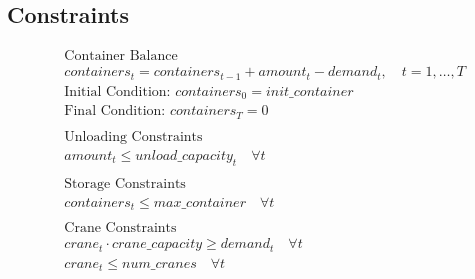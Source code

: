 \documentclass{article}
\begin{document}
\subsection*{Constraints}
\begin{align*}
    &\text{Container Balance} \\
    & containers_t = containers_{t-1} + amount_t - demand_t, \quad t = 1, \ldots, T \\
    & \text{Initial Condition: } containers_0 = init\_container \\
    & \text{Final Condition: } containers_T = 0 \\
    & \\
    &\text{Unloading Constraints} \\
    & amount_t \leq unload\_capacity_t \quad \forall t \\
    & \\
    &\text{Storage Constraints} \\
    & containers_t \leq max\_container \quad \forall t \\
    & \\
    &\text{Crane Constraints} \\
    & crane_t \cdot crane\_capacity \geq demand_t \quad \forall t \\
    & crane_t \leq num\_cranes \quad \forall t
\end{align*}
\end{document}

